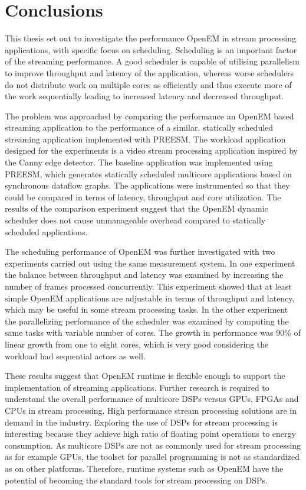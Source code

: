\chapter{Conclusions}
\label{chapter:conclusion}
This thesis set out to investigate the performance OpenEM in stream processing applications, with specific focus on scheduling. Scheduling is an important factor of the streaming performance. A good scheduler is capable of utilising parallelism to improve throughput and latency of the application, whereas worse schedulers do not distribute work on multiple cores as efficiently and thus execute more of the work sequentially leading to increased latency and decreased throughput.

The problem was approached by comparing the performance an OpenEM based streaming application to the performance of a similar, statically scheduled streaming application implemented with PREESM. The workload application designed for the experiments is a video stream processing application inspired by the Canny edge detector. The baseline application was implemented using PREESM, which generates statically scheduled multicore applications based on synchronous dataflow graphs. The applications were instrumented so that they could be compared in terms of latency, throughput and core utilization. The results of the comparison experiment suggest that the OpenEM dynamic scheduler does not cause unmanageable overhead compared to statically scheduled applications. 

The scheduling performance of OpenEM was further investigated with two experiments carried out using the same measurement system. In one experiment the balance between throughput and latency was examined by increasing the number of frames processed concurrently. This experiment showed that at least simple OpenEM applications are adjustable in terms of throughput and latency, which may be useful in some stream processing tasks. In the other experiment the parallelizing performance of the scheduler was examined by computing the same tasks with variable number of cores. The growth in performance was 90\% of linear growth from one to eight cores, which is very good considering the workload had sequential actors as well.

These results suggest that OpenEM runtime is flexible enough to support the implementation of streaming applications. Further research is required to understand the overall performance of multicore DSPs versus GPUs, FPGAs and CPUs in stream processing. High performance stream processing solutions are in demand in the industry. Exploring the use of DSPs for stream processing is interesting because they achieve high ratio of floating point operations to energy consumption. As multicore DSPs are not as commonly used for stream processing as for example GPUs, the toolset for parallel programming is not as standardized as on other platforms. Therefore, runtime systems such as OpenEM have the potential of becoming the standard tools for stream processing on DSPs.
